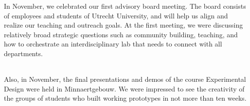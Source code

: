 \documentclass{report}
\begin{document}
In November, we celebrated our first advisory board meeting. The board consists of employees and students of Utrecht University, and will help us align and realize our teaching and outreach goals. At the first meeting, we were discussing relatively broad strategic questions such as community building, teaching, and how to orchestrate an interdisciplinary lab that needs to connect with all departments. 

\clearpage
\begin{figure}
    \centering
\end{figure}
\clearpage

 \\

Also, in November, the final presentations and demos of the course Experimental Design were held in Minnaertgebouw. We were impressed to see the creativity of the groups of students who built working prototypes in not more than ten weeks. 

\clearpage
\begin{figure}
    \centering
\end{figure}
\clearpage
\end{document}
